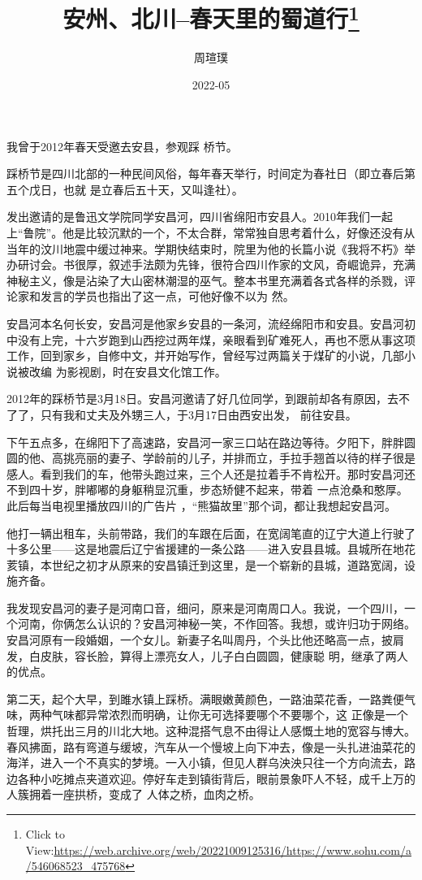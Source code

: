 \documentclass{article}
\title{安州、北川--春天里的蜀道行\footnote{Click to View:\url{https://web.archive.org/web/20221009125316/https://www.sohu.com/a/546068523_475768}}}
\author{周瑄璞}
\date{2022-05}
\begin{document}

\maketitle


\Large

﻿我曾于2012年春天受邀去安县，参观踩
桥节。 

踩桥节是四川北部的一种民间风俗，每年春天举行，时间定为春社日（即立春后第五个戊日，也就
是立春后五十天，又叫逢社）。 

发出邀请的是鲁迅文学院同学安昌河，四川省绵阳市安县人。2010年我们一起上“鲁院”。他是比较沉默的一个，不太合群，常常独自思考着什么，好像还没有从当年的汶川地震中缓过神来。学期快结束时，院里为他的长篇小说《我将不朽》举办研讨会。书很厚，叙述手法颇为先锋，很符合四川作家的文风，奇崛诡异，充满神秘主义，像是沾染了大山密林潮湿的巫气。整本书里充满着各式各样的杀戮，评
\newpage
论家和发言的学员也指出了这一点，可他好像不以为
然。 

安昌河本名何长安，安昌河是他家乡安县的一条河，流经绵阳市和安县。安昌河初中没有上完，十六岁跑到山西挖过两年煤，亲眼看到矿难死人，再也不愿从事这项工作，回到家乡，自修中文，并开始写作，曾经写过两篇关于煤矿的小说，几部小说被改编
为影视剧，时在安县文化馆工作。 

2012年的踩桥节是3月18日。安昌河邀请了好几位同学，到跟前却各有原因，去不了了，只有我和丈夫及外甥三人，于3月17日由西安出发，
前往安县。 

下午五点多，在绵阳下了高速路，安昌河一家三口站在路边等待。夕阳下，胖胖圆圆的他、高挑亮丽的妻子、学龄前的儿子，并排而立，手拉手翘首以待的样子很是感人。看到我们的车，他带头跑过来，三个人还是拉着手不肯松开。那时安昌河还不到四十岁，胖嘟嘟的身躯稍显沉重，步态矫健不起来，带着
\newpage
一点沧桑和憨厚。此后每当电视里播放四川的广告片
，“熊猫故里”那个词，都让我想起安昌河。 

他打一辆出租车，头前带路，我们的车跟在后面，在宽阔笔直的辽宁大道上行驶了十多公里——这是地震后辽宁省援建的一条公路——进入安县县城。县城所在地花荄镇，本世纪之初才从原来的安昌镇迁到这里，是一个崭新的县城，道路宽阔，设施齐备。
 

我发现安昌河的妻子是河南口音，细问，原来是河南周口人。我说，一个四川，一个河南，你俩怎么认识的？安昌河神秘一笑，不作回答。我想，或许归功于网络。安昌河原有一段婚姻，一个女儿。新妻子名叫周丹，个头比他还略高一点，披肩发，白皮肤，容长脸，算得上漂亮女人，儿子白白圆圆，健康聪
明，继承了两人的优点。 

第二天，起个大早，到雎水镇上踩桥。满眼嫩黄颜色，一路油菜花香，一路粪便气味，两种气味都异常浓烈而明确，让你无可选择要哪个不要哪个，这
\newpage
正像是一个哲理，烘托出三月的川北大地。这种混搭气息不由得让人感慨土地的宽容与博大。春风拂面，路有弯道与缓坡，汽车从一个慢坡上向下冲去，像是一头扎进油菜花的海洋，进入一个不真实的梦境。一入小镇，但见人群乌泱泱只往一个方向流去，路边各种小吃摊点夹道欢迎。停好车走到镇街背后，眼前景象吓人不轻，成千上万的人簇拥着一座拱桥，变成了
人体之桥，血肉之桥。 
\end{document}
